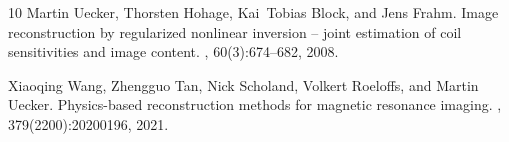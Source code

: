\documentclass{ws-m3as}
\begin{document}
\begin{thebibliography}{10}
Martin Uecker, Thorsten Hohage, Kai~Tobias Block, and Jens Frahm.
\newblock Image reconstruction by regularized nonlinear inversion -- joint
  estimation of coil sensitivities and image content.
, 60(3):674--682, 2008.

Xiaoqing Wang, Zhengguo Tan, Nick Scholand, Volkert Roeloffs, and Martin
  Uecker.
\newblock Physics-based reconstruction methods for magnetic resonance imaging.
, 379(2200):20200196, 2021.

\end{thebibliography}
\end{document}
